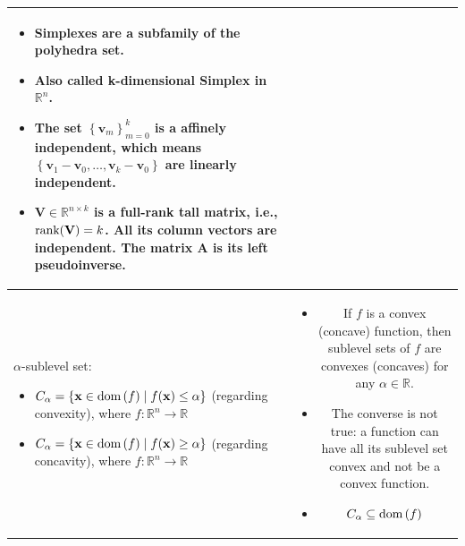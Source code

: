 \documentclass{article}
\newcommand{\dom}[1]{\ensuremath{\textnormal{dom}\left(#1\right)}} %
\begin{document}
\begin{table}[H]
\begin{tabularx}{\textwidth}{|A|C|}
\begin{itemize}[leftmargin=*]
    \item Simplexes are a subfamily of the polyhedra set.
    \item Also called k-dimensional Simplex in \(\mathbb{R}^{n}\).
    \item The set \(\left\{ \mathbf{v}_m \right\}_{m=0}^{k}\) is a affinely independent, which means \(\left\{ \mathbf{v}_1-\mathbf{v}_0, \dots, \mathbf{v}_k-\mathbf{v}_0 \right\}\) are linearly independent.
    \item \(\mathbf{V} \in \mathbb{R}^{n\times k}\) is a full-rank tall matrix, i.e., \(\textnormal{rank}(\mathbf{V}) = k\). All its column vectors are independent. The matrix \(\mathbf{A}\) is its left pseudoinverse.
\end{itemize}\\
\hline
\(\alpha\)-sublevel set:
\begin{itemize}[leftmargin=*]
    \item \(C_\alpha = \{\mathbf{x} \in \dom{f} \mid f(\mathbf{x}) \leq \alpha\}\) (regarding convexity), where \(f: \mathbb{R}^{n} \rightarrow \mathbb{R}\)
    \item \(C_\alpha = \{\mathbf{x} \in \dom{f} \mid f(\mathbf{x}) \geq \alpha\}\) (regarding concavity), where \(f: \mathbb{R}^{n} \rightarrow \mathbb{R}\)
\end{itemize} & \vspace{-3.5ex}
\begin{itemize}[leftmargin=*]
    \item If \(f\) is a convex (concave) function, then sublevel sets of \(f\) are convexes (concaves) for any \(\alpha\in \mathbb{R}\).
    \item The converse is not true: a function can have all its sublevel set convex and not be a convex function.
    \item \(C_\alpha \subseteq \dom{f}\)
\end{itemize}\\
\hline
\end{tabularx}
\end{table}
\end{document}
